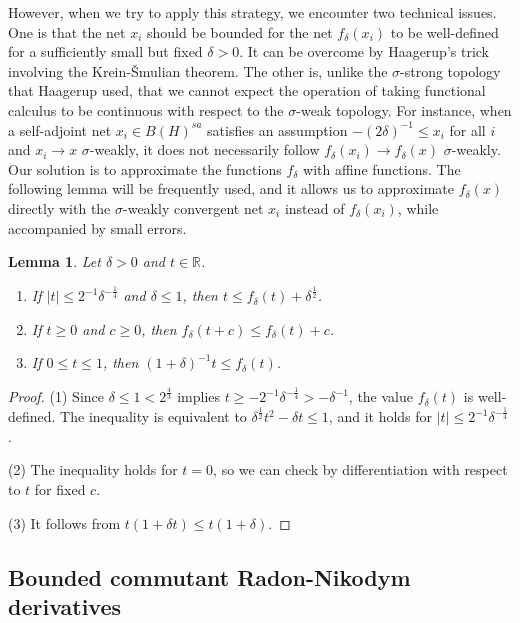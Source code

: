 \documentclass[noamsfonts,a4paper,10pt]{amsart}
\theoremstyle{plain}
\newtheorem{lemma}[theorem]{Lemma}
\theoremstyle{definition}
\begin{document}
However, when we try to apply this strategy, we encounter two technical issues.
One is that the net $x_i$ should be bounded for the net $f_\delta(x_i)$ to be well-defined for a sufficiently small but fixed $\delta>0$.
It can be overcome by Haagerup's trick involving the Krein-\v Smulian theorem.
The other is, unlike the $\sigma$-strong topology that Haagerup used, that we cannot expect the operation of taking functional calculus to be continuous with respect to the $\sigma$-weak topology.
For instance, when a self-adjoint net $x_i\in B(H)^{sa}$ satisfies an assumption $-(2\delta)^{-1}\le x_i$ for all $i$ and $x_i\to x$ $\sigma$-weakly, it does not necessarily follow $f_\delta(x_i)\to f_\delta(x)$ $\sigma$-weakly.
Our solution is to approximate the functions $f_\delta$ with affine functions.
The following lemma will be frequently used, and it allows us to approximate $f_\delta(x)$ directly with the $\sigma$-weakly convergent net $x_i$ instead of $f_\delta(x_i)$, while accompanied by small errors.
\begin{lemma}
Let $\delta>0$ and $t\in\mathbb{R}$.
\begin{enumerate}
\item[(1)] If $|t|\le2^{-1}\delta^{-\frac14}$ and $\delta\le1$, then $t\le f_\delta(t)+\delta^{\frac12}$.
\item[(2)] If $t\ge0$ and $c\ge0$, then $f_\delta(t+c)\le f_\delta(t)+c$.
\item[(3)] If $0\le t\le1$, then $(1+\delta)^{-1}t\le f_\delta(t)$.
\end{enumerate}
\end{lemma}
\begin{proof}
(1)
Since $\delta\le1<2^{\frac43}$ implies $t\ge-2^{-1}\delta^{-\frac14}>-\delta^{-1}$, the value $f_\delta(t)$ is well-defined.
The inequality is equivalent to $\delta^{\frac12}t^2-\delta t\le1$, and it holds for $|t|\le2^{-1}\delta^{-\frac14}$.

(2)
The inequality holds for $t=0$, so we can check by differentiation with respect to $t$ for fixed $c$.

(3)
It follows from $t(1+\delta t)\le t(1+\delta)$.
\end{proof}


\subsection{Bounded commutant Radon-Nikodym derivatives}
\end{document}
